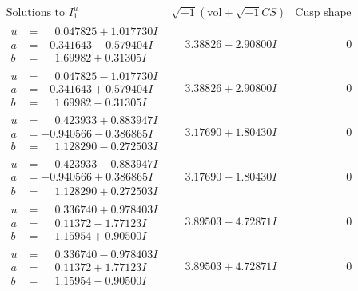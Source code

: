 \documentclass[1p]{elsarticle_modified}
\theoremstyle{definition}
\newcommand{\I}{\sqrt{-1}}
\begin{document}
$$\begin{array}{c|c|c}  
\text{Solutions to }I^u_{1}& \I (\text{vol} + \sqrt{-1}CS) & \text{Cusp shape}\\
 \hline 
\begin{aligned}
u &= \phantom{-}0.047825 + 1.017730 I \\
a &= -0.341643 - 0.579404 I \\
b &= \phantom{-}1.69982 + 0.31305 I\end{aligned}
 & \phantom{-}3.38826 - 2.90800 I & \phantom{-0.000000 } 0 \\ \hline\begin{aligned}
u &= \phantom{-}0.047825 - 1.017730 I \\
a &= -0.341643 + 0.579404 I \\
b &= \phantom{-}1.69982 - 0.31305 I\end{aligned}
 & \phantom{-}3.38826 + 2.90800 I & \phantom{-0.000000 } 0 \\ \hline\begin{aligned}
u &= \phantom{-}0.423933 + 0.883947 I \\
a &= -0.940566 - 0.386865 I \\
b &= \phantom{-}1.128290 - 0.272503 I\end{aligned}
 & \phantom{-}3.17690 + 1.80430 I & \phantom{-0.000000 } 0 \\ \hline\begin{aligned}
u &= \phantom{-}0.423933 - 0.883947 I \\
a &= -0.940566 + 0.386865 I \\
b &= \phantom{-}1.128290 + 0.272503 I\end{aligned}
 & \phantom{-}3.17690 - 1.80430 I & \phantom{-0.000000 } 0 \\ \hline\begin{aligned}
u &= \phantom{-}0.336740 + 0.978403 I \\
a &= \phantom{-}0.11372 - 1.77123 I \\
b &= \phantom{-}1.15954 + 0.90500 I\end{aligned}
 & \phantom{-}3.89503 - 4.72871 I & \phantom{-0.000000 } 0 \\ \hline\begin{aligned}
u &= \phantom{-}0.336740 - 0.978403 I \\
a &= \phantom{-}0.11372 + 1.77123 I \\
b &= \phantom{-}1.15954 - 0.90500 I\end{aligned}
 & \phantom{-}3.89503 + 4.72871 I & \phantom{-0.000000 } 0 \\ \hline\begin{aligned}

\end{aligned}
\end{array}$$
\end{document}
